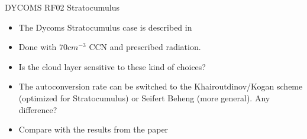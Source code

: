 \begin{frame}{DYCOMS RF02 Stratocumulus}
 \begin{itemize}
  \item The Dycoms Stratocumulus case is described in 
  \item Done with $70 cm^{-3}$ CCN and prescribed radiation.
  \item Is the cloud layer sensitive to these kind of choices?
  \item The autoconversion rate can be switched to the Khairoutdinov/Kogan scheme (optimized for Stratocumulus) or Seifert Beheng (more general). Any difference?
  \item Compare with the results from the paper
 \end{itemize}

\end{frame}

